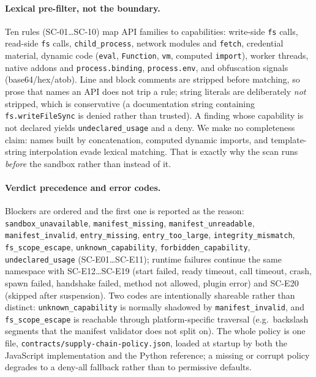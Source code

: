 \paragraph{Lexical pre-filter, not the boundary.}
Ten rules (SC-01\ldots SC-10) map API families to capabilities:
write-side \texttt{fs} calls, read-side \texttt{fs} calls,
\texttt{child\_process}, network modules and \texttt{fetch}, credential
material, dynamic code (\texttt{eval}, \texttt{Function}, \texttt{vm},
computed \texttt{import}), worker threads, native addons and
\texttt{process.binding}, \texttt{process.env}, and obfuscation signals
(base64/hex/atob). Line and block comments are stripped before matching, so
prose that names an API does not trip a rule; string literals are
deliberately \emph{not} stripped, which is conservative (a documentation
string containing \texttt{fs.writeFileSync} is denied rather than trusted).
A finding whose capability is not declared yields
\texttt{undeclared\_usage} and a deny. We make no completeness claim: names
built by concatenation, computed dynamic imports, and
template-string interpolation evade lexical matching. That is exactly why the
scan runs \emph{before} the sandbox rather than instead of it.

\paragraph{Verdict precedence and error codes.}
Blockers are ordered and the first one is reported as the reason:
\texttt{sandbox\_unavailable}, \texttt{manifest\_missing},
\texttt{manifest\_unreadable}, \texttt{manifest\_invalid},
\texttt{entry\_missing}, \texttt{entry\_too\_large},
\texttt{integrity\_mismatch}, \texttt{fs\_scope\_escape},
\texttt{unknown\_capability}, \texttt{forbidden\_capability},
\texttt{undeclared\_usage} (SC-E01\ldots SC-E11); runtime failures continue
the same namespace with SC-E12\ldots SC-E19 (start failed, ready timeout,
call timeout, crash, spawn failed, handshake failed, method not allowed,
plugin error) and SC-E20 (skipped after suspension). Two codes are
intentionally shareable rather than distinct: \texttt{unknown\_capability}
is normally shadowed by \texttt{manifest\_invalid}, and
\texttt{fs\_scope\_escape} is reachable through platform-specific
traversal (e.g.\ backslash segments that the manifest validator does not
split on). The whole policy is one file,
\texttt{contracts/supply-chain-policy.json}, loaded at startup by both the
JavaScript implementation and the Python reference; a missing or corrupt
policy degrades to a deny-all fallback rather than to permissive defaults.

